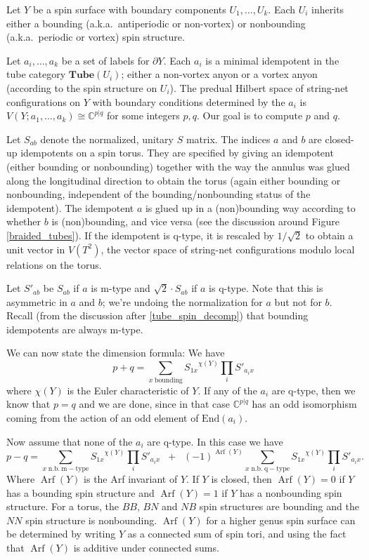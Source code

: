 \documentclass[12pt,a4paper]{article}
\newcommand{\cc}{\mathbb{C}}
\newcommand\be            {\begin{equation}}
\newcommand\ee            {\end{equation}}
\newcommand{\End}{\text{End}}
\newcommand{\tube}{\textbf{Tube}}
\newcommand{\bd}{\partial}
\DeclareMathOperator{\Arf}{Arf}
\begin{document}
Let $Y$ be a spin surface with boundary components $U_1, \ldots, U_k$.
Each $U_i$ inherits either a bounding (a.k.a.\ antiperiodic or non-vortex) or nonbounding 
(a.k.a.\ periodic or vortex) spin structure.

Let $a_i,\ldots, a_k$ be a set of labels for $\bd Y$.
Each $a_i$ is a minimal idempotent in the tube category $\tube(U_i)$; either a non-vortex anyon or a vortex anyon
(according to the spin structure on $U_i$).
The predual Hilbert space of string-net configurations on $Y$ with boundary conditions determined by the $a_i$ is $V(Y; a_1,\ldots, a_k) \cong \cc^{p|q}$ for some integers $p,q$.
Our goal is to compute $p$ and $q$.

\medskip

Let $S_{ab}$ denote the normalized, unitary $S$ matrix.
The indices $a$ and $b$ are closed-up idempotents on a spin torus.
They are specified by giving an idempotent (either bounding or nonbounding) together with
the way the annulus was glued along the longitudinal direction to obtain the torus (again either bounding or nonbounding,
independent of the bounding/nonbounding status of the idempotent).
The idempotent $a$ is glued up in a (non)bounding way according to whether $b$ is (non)bounding, and vice versa (see the discussion around Figure \ref{braided_tubes}).
If the idempotent is q-type, it is rescaled by $1/\sqrt 2$ to obtain a unit vector in $V(T^2)$, the vector space of string-net configurations modulo local relations on the torus.

Let $S'_{ab}$ be $S_{ab}$ if $a$ is m-type and $\sqrt 2 \cdot S_{ab}$ if $a$ is q-type.
Note that this is asymmetric in $a$ and $b$;
we're undoing the normalization for $a$ but not for $b$.
Recall (from the discussion after \eqref{tube_spin_decomp}) that bounding idempotents are always m-type.

\medskip

We can now state the dimension formula:
We have
\be
	p + q = \sum_{x\;  \mathrm{bounding}} {S_{1x}}^{\chi(Y)} {\textstyle \prod_i} S'_{a_i x} 
	\label{PplusQ}
\ee
where $\chi(Y)$ is the Euler characteristic of $Y$.
If any of the $a_i$ are q-type, then we know that $p=q$ and we are done, since in that case 
$\cc^{p|q}$ has an odd isomorphism coming from the action of an odd element of $\End(a_i)$.

Now assume that none of the $a_i$ are q-type.
In this case we have
\be
	p - q = \sum_{x\;  \mathrm{n.b.\ m-type}} {S_{1x}}^{\chi(Y)} {\textstyle \prod_i} S'_{a_i x}
			\;\;+\;\; (-1)^{\Arf(Y)} \sum_{x\;  \mathrm{n.b.\ q-type}} {S_{1x}}^{\chi(Y)} {\textstyle \prod_i} S'_{a_i x} .
			\label{PminusQ}
\ee
Where $\Arf(Y)$ is the Arf invariant of $Y$.
If $Y$ is closed, then $\Arf(Y) = 0$ if $Y$ has a bounding spin structure and 
$\Arf(Y) = 1$ if $Y$ has a nonbounding spin structure.
For a torus, the $BB$, $BN$ and $NB$ spin structures are bounding and the $NN$ spin structure is nonbounding.
$\Arf(Y)$ for a higher genus spin surface can be determined by writing $Y$ as a connected sum of spin tori,
and using the fact that $\Arf(Y)$ is additive under connected sums.
\end{document}
